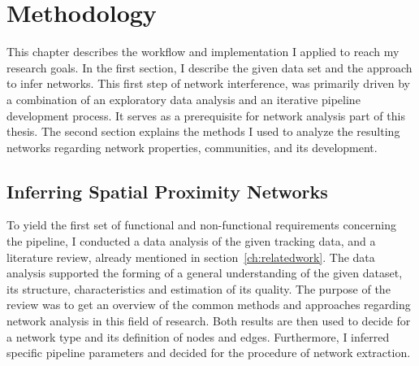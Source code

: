 \chapter{Methodology}
\label{ch:approach}

This chapter describes the workflow and implementation I applied to reach my research goals. 
In the first section, I describe the given data set and the approach to infer networks.
This first step of network interference, was primarily driven by a combination of an exploratory data analysis and an iterative pipeline development process.
It serves as a prerequisite for network analysis part of this thesis.
The second section explains the methods I used to analyze the resulting networks regarding network properties, communities, and its development.

\section{Inferring Spatial Proximity Networks}
\label{sec:infNetworks}
To yield the first set of functional and non-functional requirements concerning the pipeline, I conducted a data analysis of the given tracking data, and a literature review, already mentioned in section~\ref{ch:relatedwork}.
The data analysis supported the forming of a general understanding of the given dataset, its structure, characteristics and estimation of its quality.
The purpose of the review was to get an overview of the common methods and approaches regarding network analysis in this field of research.
Both results are then used to decide for a network type and its definition of nodes and edges.
Furthermore, I inferred specific pipeline parameters and decided for the procedure of network extraction.


